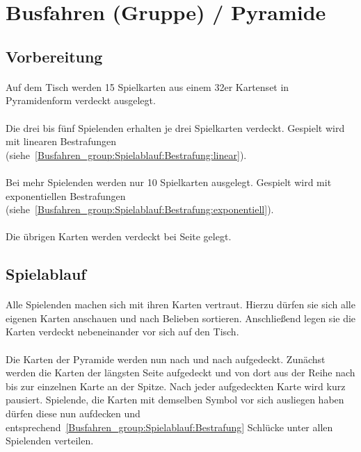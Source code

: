 \section{Busfahren (Gruppe) / Pyramide}
\subsection{Vorbereitung}
\paragraph{}
Auf dem Tisch werden 15 Spielkarten aus einem 32er Kartenset in Pyramidenform verdeckt ausgelegt.

\paragraph{}
Die drei bis fünf Spielenden erhalten je drei Spielkarten verdeckt. Gespielt wird mit linearen Bestrafungen (siehe~\ref{Busfahren_group:Spielablauf:Bestrafung:linear}).

\paragraph{}
Bei mehr Spielenden werden nur 10 Spielkarten ausgelegt. Gespielt wird mit exponentiellen Bestrafungen (siehe~\ref{Busfahren_group:Spielablauf:Bestrafung:exponentiell}).

\paragraph{}
Die übrigen Karten werden verdeckt bei Seite gelegt.

\subsection{Spielablauf}
\paragraph{}
Alle Spielenden machen sich mit ihren Karten vertraut.
Hierzu dürfen sie sich alle eigenen Karten anschauen und nach Belieben sortieren.
Anschließend legen sie die Karten verdeckt nebeneinander vor sich auf den Tisch.

\paragraph{}
Die Karten der Pyramide werden nun nach und nach aufgedeckt.
Zunächst werden die Karten der längsten Seite aufgedeckt und von dort aus der Reihe nach bis zur einzelnen Karte an der Spitze.
Nach jeder aufgedeckten Karte wird kurz pausiert.
Spielende, die Karten mit demselben Symbol vor sich ausliegen haben dürfen diese nun aufdecken und entsprechend~\ref{Busfahren_group:Spielablauf:Bestrafung} Schlücke unter allen Spielenden verteilen.

